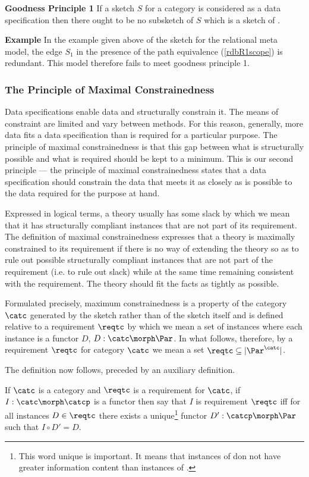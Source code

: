 \textbf{Goodness Principle 1} If a sketch $S$ for a category \catcw 
is considered as a data specification then  there ought to be no subsketch of $S$ which is a sketch of \catcw. 

\textbf{Example} In the example given above of the sketch for the relational meta model, 
the edge $S_1$ in the presence of the path equivalence (\ref{rdbR1scope}) is redundant. This model therefore fails to meet goodness principle 1.

\subsubsection{The Principle of Maximal Constrainedness}

Data specifications enable data and structurally constrain it. The means of constraint are limited and vary between methods. For this reason, generally, more data fits a data specification than is required for a particular purpose.  The principle of maximal constrainedness is that this gap between what is structurally possible and what is required should be kept to a minimum. This is our second principle 
--- the principle of maximal constrainedness states that a data specification should constrain the data that meets it as closely as is possible to the data required for the purpose at hand. 

Expressed in logical terms, a theory usually has some slack by which we mean that it has structurally compliant instances that are not part of its requirement.  The definition of maximal constrainedness expresses that a theory is maximally constrained to its requirement if there is no way of extending the theory so as to rule out possible structurally compliant instances that are not part of the requirement (i.e. to rule out slack) while at the same time remaining consistent with the requirement. The theory should fit the facts as tightly as possible.

Formulated precisely, maximum constrainedness  is a property of the category $\catc$ generated by the sketch  rather than of the sketch itself and is defined  relative to a requirement $\reqtc$ by which we mean a set of 
instances where each instance is a functor $D$, $D: \catc \morph \Par$. In what follows, therefore,  by a requirement $\reqtc$ for category $\catc$ we mean a set  $\reqtc \subseteq | \Par^{\catc} |$. 

The definition now follows, preceded by an auxiliary definition.
\begin{definition}
If $\catc$ is a category and $\reqtc$ is a requirement for $\catc$,  if $I: \catc \morph \catcp$ is a functor then say that $I$ is  requirement $\reqtc$ iff for all instances $D \in \reqtc$ 
there exists a unique\footnote{This word unique is important. It means that 
instances of \catcpw don not have greater information content than
instances of \catcw.}
 functor $D':\catcp \morph \Par$ such that $I \circ D'=D$.

\end{definition}

